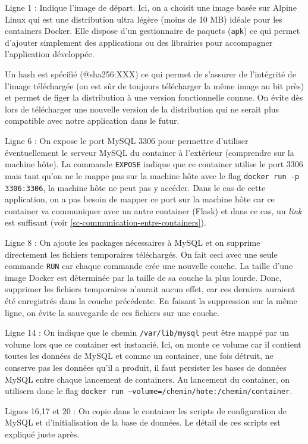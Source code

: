 \documentclass[11pt,a4paper,oneside]{report}
\newcommand{\code}[1]{\texttt{#1}}
\begin{document}
Ligne 1 : Indique l'image de départ. Ici, on a choisit une image basée sur Alpine Linux qui est une distribution ultra légère (moins de 10 MB) idéale pour les containers Docker. Elle dispose d'un gestionnaire de paquets (\code{apk}) ce qui permet d'ajouter simplement des applications ou des librairies pour accompagner l'application développée.

Un hash est spécifié (@sha256:XXX) ce qui permet de s'assurer de l'intégrité de l'image téléchargée (on est sûr de toujours télécharger la même image au bit près) et permet de figer la distribution à une version fonctionnelle connue. On évite dès lors de télécharger une nouvelle version de la distribution qui ne serait plus compatible avec notre application dans le futur.

Ligne 6 : On expose le port MySQL 3306 pour permettre d'utiliser éventuellement le serveur MySQL du container à l'extérieur (comprendre sur la machine hôte). La commande \code{EXPOSE} indique que ce container utilise le port 3306 mais tant qu'on ne le mappe pas sur la machine hôte avec le flag \code{docker run -p 3306:3306}, la machine hôte ne peut pas y accéder. Dans le cas de cette application, on a pas besoin de mapper ce port sur la machine hôte car ce container va communiquer avec un autre container (Flask) et dans ce cas, un \textit{link} est suffisant (voir \ref{sc-communication-entre-containers}).

Ligne 8 : On ajoute les packages nécessaires à MySQL et on supprime directement les fichiers temporaires téléchargés. On fait ceci avec une seule commande \code{RUN} car chaque commande crée une nouvelle couche. La taille d'une image Docker est déterminée par la taille de sa couche la plus lourde. Donc, supprimer les fichiers temporaires n'aurait aucun effet, car ces derniers auraient été enregistrés dans la couche précédente. En faisant la suppression sur la même ligne, on évite la sauvegarde de ces fichiers sur une couche.

Ligne 14 : On indique que le chemin \code{/var/lib/mysql} peut être mappé par un volume lors que ce container est instancié. Ici, on monte ce volume car il contient toutes les données de MySQL et comme un container, une fois détruit, ne conserve pas les données qu'il a produit, il faut persister les bases de données MySQL entre chaque lancement de containers. Au lancement du container, on utilisera donc le flag \code{docker run --volume=/chemin/hote:/chemin/container}.

Lignes 16,17 et 20 : On copie dans le container les scripts de configuration de MySQL et d'initialisation de la base de données. Le détail de ces scripts est expliqué juste après.
\end{document}
